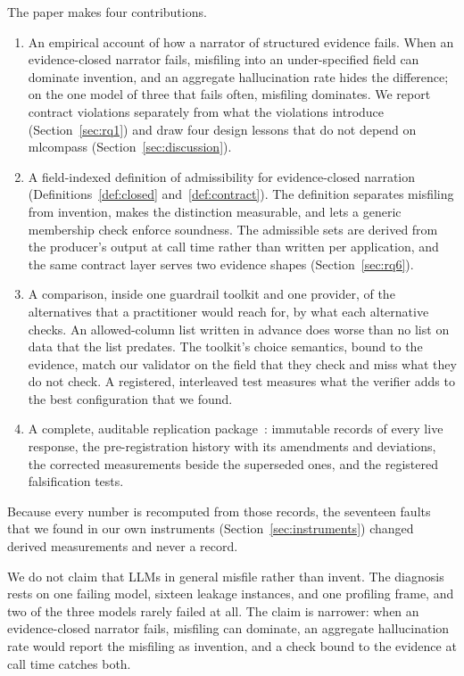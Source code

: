 \documentclass[journal]{IEEEtran}
\begin{document}
The paper makes four contributions.
\begin{enumerate}
\item An empirical account of how a narrator of structured evidence fails.
When an evidence-closed narrator fails, misfiling into an under-specified
field can dominate invention, and an aggregate hallucination rate hides the
difference; on the one model of three that fails often, misfiling dominates.
We report contract violations separately from what the violations introduce
(Section~\ref{sec:rq1}) and draw four design lessons that do not depend on
mlcompass (Section~\ref{sec:discussion}).
\item A field-indexed definition of admissibility for evidence-closed narration
(Definitions~\ref{def:closed} and~\ref{def:contract}). The definition
separates misfiling from invention, makes the distinction measurable, and lets
a generic membership check enforce soundness. The admissible sets are derived
from the producer's output at call time rather than written per application,
and the same contract layer serves two evidence shapes
(Section~\ref{sec:rq6}).
\item A comparison, inside one guardrail toolkit and one provider, of the
alternatives that a practitioner would reach for, by what each alternative
checks. An allowed-column list written in advance does worse than no list on
data that the list predates. The toolkit's choice semantics, bound to the
evidence, match our validator on the field that they check and miss what they
do not check. A registered, interleaved test measures what the verifier adds
to the best configuration that we found.
\item A complete, auditable replication package~\cite{replication}:
immutable records of every live response, the pre-registration history with its
amendments and deviations, the corrected measurements beside the superseded
ones, and the registered falsification tests.
\end{enumerate}

Because every number is recomputed from those records, the seventeen faults
that we found in our own instruments (Section~\ref{sec:instruments}) changed
derived measurements and never a record.

We do not claim that LLMs in general misfile rather than invent. The
diagnosis rests on one failing model, sixteen leakage instances, and one
profiling frame, and two of the three models rarely failed at all. The claim
is narrower: when an evidence-closed narrator fails, misfiling can dominate,
an aggregate hallucination rate would report the misfiling as invention, and a
check bound to the evidence at call time catches both.
\end{document}
